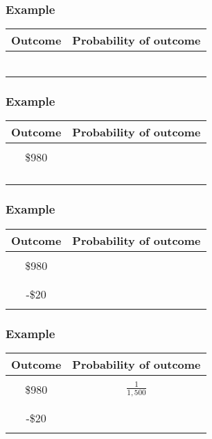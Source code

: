 \begin{frame}
\frametitle{Example}
\begin{center}
\begin{tabular}{|c|c|}
\hline
Outcome	&Probability of outcome\\
\hline
&\\
	  & \\
&\\
\hline
&\\
	& \\
&\\
\hline
\end{tabular} 
\end{center}
\end{frame}


\begin{frame}
\frametitle{Example}
\begin{center}
\begin{tabular}{|c|c|}
\hline
Outcome	&Probability of outcome\\
\hline
&\\
\$980	  & \\
&\\
\hline
&\\
	& \\
&\\
\hline
\end{tabular} 
\end{center}
\end{frame}

\begin{frame}
\frametitle{Example}

\begin{center}
\begin{tabular}{|c|c|}
\hline
Outcome	&Probability of outcome\\
\hline
&\\
\$980	  & \\
&\\
\hline
&\\
-\$20	& \\
&\\
\hline
\end{tabular} 
\end{center}
\end{frame}

\begin{frame}
\frametitle{Example}
\begin{center}
\begin{tabular}{|c|c|}
\hline
Outcome	&Probability of outcome\\
\hline
&\\
\$980	  & $\frac{1}{1,500}$ \\
&\\
\hline
&\\
-\$20	& \\
&\\
\hline
\end{tabular} 
\end{center}
\end{frame}

